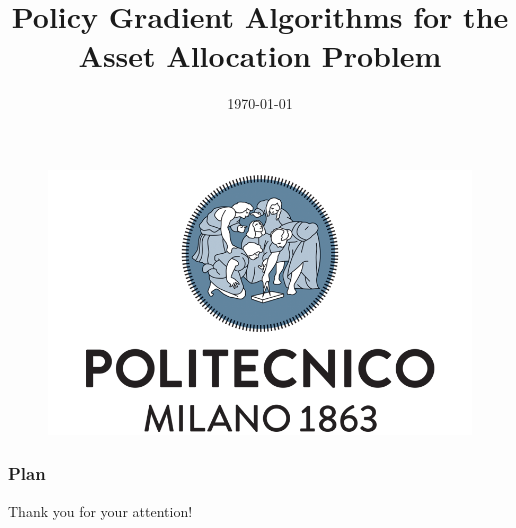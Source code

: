\documentclass[11.5pt, aspectratio=169]{beamer} %
\title[]{Policy Gradient Algorithms for the Asset Allocation Problem}
\author[P.\,Necchi]
{%
  \texorpdfstring{
    \begin{columns}%
      \column{1\linewidth}
      \centering
      Pierpaolo Necchi\\
      \href{mailto:pierpaolo.necchi@gmail.com}{pierpaolo.necchi@gmail.com}
    \end{columns}
  }
  {Pierpaolo Necchi}
}
\institute[Polimi] %
{%
}
\date{\today}
\begin{document}
\begin{frame}[plain]
	\begin{figure}[htpb]
		\centering
		\includegraphics[width=0.4\linewidth]{Images/polimi_name}
	\end{figure}
	\titlepage
\end{frame}





\begin{frame}
\frametitle{Plan} %
\tableofcontents %
\end{frame}







\begin{frame}[c]{}
  \begin{center}
	  \Huge Thank you for your attention!
  \end{center} 
\end{frame}


\appendix
\backupbegin

\begin{frame}
\frametitle{\refname}
\nocite{*}


\end{frame}



\backupend
\end{document}
